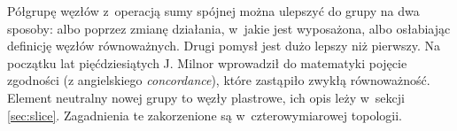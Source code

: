 Półgrupę węzłów z~operacją sumy spójnej można ulepszyć do grupy na dwa sposoby:
albo poprzez zmianę działania, w~jakie jest wyposażona,
albo osłabiając definicję węzłów równoważnych.
Drugi pomysł jest dużo lepszy niż pierwszy.
Na początku lat pięćdziesiątych J. Milnor wprowadził do matematyki pojęcie zgodności
(z angielskiego \emph{concordance}), które zastąpiło zwykłą równoważność.
Element neutralny nowej grupy to węzły plastrowe, ich opis leży w~sekcji \ref{sec:slice}.
Zagadnienia te zakorzenione są w~czterowymiarowej topologii.


